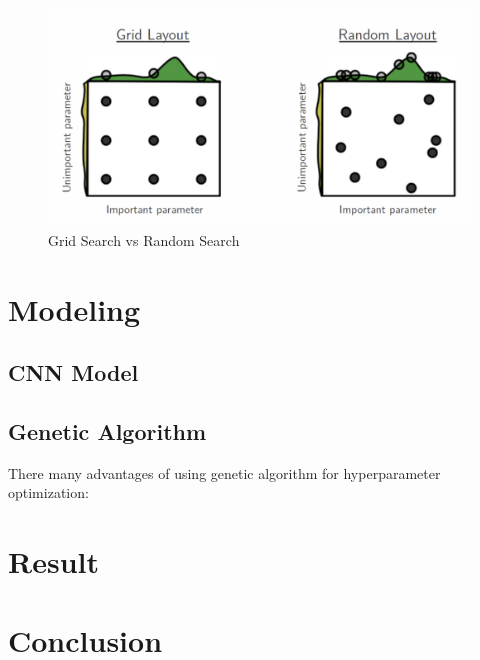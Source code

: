 \documentclass[12pt]{article}
\begin{document}
\begin{figure}\label{fig:dd}
\begin{center}
\includegraphics[width = 5.5in]{grid_vs_random.png}
\caption{Grid Search vs Random Search}
\end{center}
\end{figure}



\section{Modeling}

\subsection{CNN Model}

\subsection{Genetic Algorithm}
There many advantages of using genetic algorithm for hyperparameter optimization:
\section{Result}

\section{Conclusion}
\end{document}

